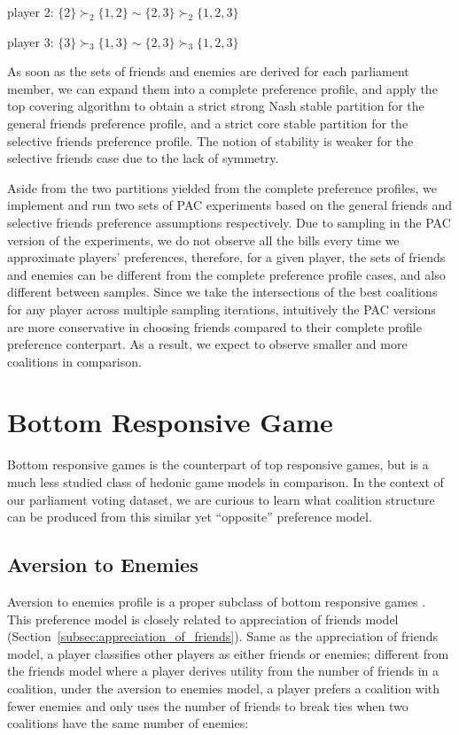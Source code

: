 player 2: $\{2\} \succ_2 \{1, 2\} \sim \{2, 3\} \succ_2 \{1, 2, 3\} $

player 3: $\{3\} \succ_3 \{1, 3\} \sim \{2, 3\} \succ_3 \{1, 2, 3\}$

As soon as the sets of friends and enemies are derived for each parliament member,
we can expand them into a complete preference profile, and apply the top covering
algorithm to obtain a strict strong Nash stable partition for the general friends
preference profile, and a strict core stable partition for the selective friends
preference profile. The notion of stability is weaker for the selective friends
case due to the lack of symmetry.

Aside from the two partitions yielded from the complete preference profiles,
we implement and run two sets of PAC experiments based on the general friends
and selective friends preference assumptions respectively.
Due to sampling in the PAC version of the experiments, we do not observe all
the bills every time we approximate players' preferences,
therefore, for a given player, the sets of friends and enemies can be different
from the complete preference profile cases, and also different between samples.
Since we take the intersections of the best coalitions for any player across
multiple sampling iterations, intuitively the PAC versions are more conservative
in choosing friends compared to their complete profile preference conterpart.
As a result, we expect to observe smaller and more coalitions in comparison.


\section{Bottom Responsive Game}
\label{sec:bottom_responsive_game}

Bottom responsive games is the counterpart of top responsive games, but is a
much less studied class of hedonic game models in comparison.
In the context of our parliament voting dataset, we are curious to learn what
coalition structure can be produced from this similar yet ``opposite''
preference model.

\subsection{Aversion to Enemies}
\label{subsec:aversion_to_enemies}

Aversion to enemies profile is a proper subclass of bottom responsive games
\cite{SuSu10}.
This preference model is closely related to appreciation of friends model
(Section~\ref{subsec:appreciation_of_friends}).
Same as the appreciation of friends model, a player classifies other players as
either friends or enemies; different from the friends model where a player
derives utility from the number of friends in a coalition, under the aversion
to enemies model, a player prefers a coalition with fewer enemies and only uses
the number of friends to break ties when two coalitions have the same number
of enemies:

